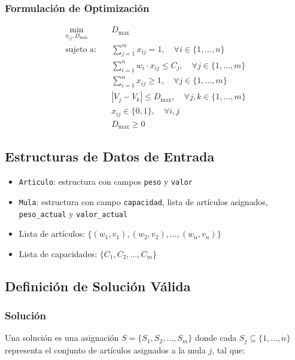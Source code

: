 \documentclass[12pt, a4paper]{article}
\begin{document}
    \subsubsection{Formulación de Optimización}
    \begin{align*}
    \min_{x_{ij}, D_{\max}} \quad & D_{\max} \\
    \text{sujeto a:} \quad & \sum_{j=1}^{m} x_{ij} = 1, \quad \forall i \in \{1,\ldots,n\} \\
    & \sum_{i=1}^{n} w_i \cdot x_{ij} \leq C_j, \quad \forall j \in \{1,\ldots,m\} \\
    & \sum_{i=1}^{n} x_{ij} \geq 1, \quad \forall j \in \{1,\ldots,m\} \\
    & |V_j - V_k| \leq D_{\max}, \quad \forall j,k \in \{1,\ldots,m\} \\
    & x_{ij} \in \{0,1\}, \quad \forall i,j \\
    & D_{\max} \geq 0
    \end{align*}

    \subsection{Estructuras de Datos de Entrada}
    \begin{itemize}
        \item \texttt{Articulo}: estructura con campos \texttt{peso} y \texttt{valor}
        \item \texttt{Mula}: estructura con campo \texttt{capacidad}, lista de artículos asignados, \texttt{peso\_actual} y \texttt{valor\_actual}
        \item Lista de artículos: $\{(w_1, v_1), (w_2, v_2), \ldots, (w_n, v_n)\}$
        \item Lista de capacidades: $\{C_1, C_2, \ldots, C_m\}$
    \end{itemize}

    \subsection{Definición de Solución Válida}

    \subsubsection{Solución}
    Una solución es una asignación $S = \{S_1, S_2, \ldots, S_m\}$ donde cada $S_j \subseteq \{1,\ldots,n\}$ representa el conjunto de artículos asignados a la mula $j$, tal que:
\end{document}
